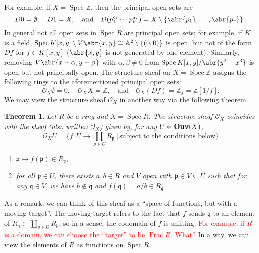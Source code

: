 \documentclass[11pt,leqno]{article}
\newcommand{\sai}[1]{\textcolor{red}{#1}}
\theoremstyle{plain}
\newtheorem{theorem}[lem]{Theorem}
\theoremstyle{definition}
\numberwithin{equation}{section}
\numberwithin{lem}{section}
\newcommand{\cbr}[1]{\left\{#1\right\}}
\DeclareMathOperator{\Spec}{Spec}
\DeclareMathOperator{\Frac}{Frac}
\newcommand{\catname}[1]{{\normalfont\mathbf{#1}}}
\newcommand{\Ouv}{\catname{Ouv}}
\begin{document}
For example, if $X = \Spec \mathbb Z$, then the principal open sets are
\begin{equation}
    D0 = \emptyset,\quad D1 = X,\quad\text{and}\quad D(p_1^{e_1}\cdots p_r^{a_r}) = X\setminus\cbr{\abr{p_1},\dots,\abr{p_r}}.
\end{equation}
In general not all open sets in $\Spec R$ are principal open sets; for example, if $K$ is a field, $\Spec K[x,y]\setminus V\abr{x,y}\cong \mathbb A^2\setminus \cbr{(0,0)}$ is open, but not of the form $Df$ for $f\in K[x,y]$ ($\abr{x,y}$ is not generated by one element). Similarly, removing $V\abr{x-\alpha,y-\beta}$ with $\alpha,\beta\neq 0$ from $\Spec K[x,y]/\abr{y^2-x^3}$ is open but not principally open. The structure sheaf on $X = \Spec\mathbb Z$ assigns the following rings to the aforementioned principal open sets:
\begin{equation}
    \mathscr O_X\emptyset = 0,\quad \mathscr O_XX = \mathbb Z,\quad \text{and}\quad \mathscr O_X(Df) = \mathbb Z_f = \mathbb Z[1/f].
\end{equation}
We may view the structure sheaf $\mathscr O_X$ in another way via the following theorem.
\begin{theorem}
    Let $R$ be a ring and $X = \Spec R$. The structure sheaf $\mathscr O_X$ coincides with the sheaf (also written $\mathscr O_X$) given by, for any $U\in\Ouv(X)$,
    \begin{equation}
        \mathscr O_XU = \bigg\{f\colon U\to \coprod_{\mathfrak p\in U}R_{\mathfrak p}~\bigg\vert\, \text{subject to the conditions below}\bigg\}
    \end{equation}
    \begin{enumerate}
        \item $\mathfrak p\mapsto f(\mathfrak p)\in R_{\mathfrak p}$,
        \item for all $\mathfrak p\in U$, there exists $a,b\in R$ and $V$ open with $\mathfrak p\in V\subseteq U$ such that for any $\mathfrak q\in V$, we have $b\not\in \mathfrak q$ and $f(\mathfrak q) = a/b\in R_{\mathfrak q}$.
    \end{enumerate}
\end{theorem}
As a remark, we can think of this sheaf as a ``space of functions, but with a moving target''. The moving target refers to the fact that $f$ sends $\mathfrak q$ to an element of $R_{\mathfrak q}\subset \coprod_{\mathfrak p\in U}R_{\mathfrak p}$, so in a sense, the codomain of $f$ is shifting. \sai{For example, if $R$ is a domain, we can choose the ``target'' to be $\Frac R$. What?} In a way, we can view the elements of $R$ as functions on $\Spec R$.
\end{document}
